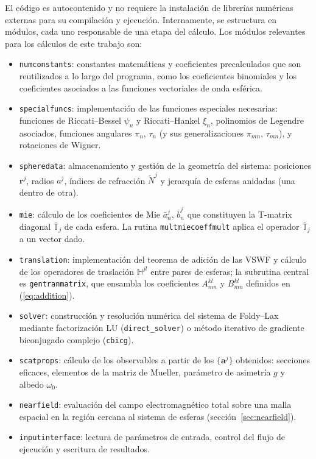 El código es autocontenido y no requiere la instalación de librerías
numéricas externas para su compilación y ejecución. Internamente,
se estructura en módulos, cada uno responsable de una etapa del cálculo.
Los módulos relevantes para los cálculos de este trabajo son:

\begin{itemize}
  \item \texttt{numconstants}: constantes matemáticas y coeficientes
        precalculados que son reutilizados a lo largo del programa,
        como los coeficientes binomiales y los coeficientes asociados a
        las funciones vectoriales de onda esférica.
  \item \texttt{specialfuncs}: implementación de las funciones especiales
        necesarias: funciones de Riccati--Bessel $\psi_n$ y
        Riccati--Hankel $\xi_n$, polinomios de Legendre asociados,
        funciones angulares $\pi_n,\,\tau_n$ (y sus generalizaciones
        $\pi_{mn},\,\tau_{mn}$), y rotaciones de Wigner.
  \item \texttt{spheredata}: almacenamiento y gestión de la geometría
        del sistema: posiciones $\mathbf{r}^j$, radios $a^j$, índices
        de refracción $\tilde{N}^j$ y jerarquía de esferas anidadas (una dentro de otra).
  \item \texttt{mie}: cálculo de los coeficientes de Mie $\bar a_n^j$,
        $\bar b_n^j$ que constituyen la T-matrix diagonal
        $\bar{\mathbb{T}}_j$ de cada esfera. 
        La rutina \texttt{multmiecoeffmult} aplica
        el operador $\bar{\mathbb{T}}_j$ a un vector dado.
  \item \texttt{translation}: implementación del teorema de adición de
        las VSWF y cálculo de los operadores de traslación
        $\mathbb{H}^{jl}$ entre pares de esferas; la subrutina central es
        \texttt{gentranmatrix}, que ensambla los coeficientes
        $A_{mn}^{kl}$ y $B_{mn}^{kl}$ definidos en
        (\ref{eq:addition}).
  \item \texttt{solver}: construcción y resolución numérica del
        sistema de Foldy--Lax mediante factorización LU
        (\texttt{direct\_solver}) o método iterativo de gradiente
        biconjugado complejo (\texttt{cbicg}). 
  \item \texttt{scatprops}: cálculo de los observables a partir de los
        $\{\mathbf{a}^{j}\}$ obtenidos: secciones eficaces, elementos 
        de la matriz de Mueller, parámetro de asimetría $g$ y albedo $\omega_0$.
  \item \texttt{nearfield}: evaluación del campo electromagnético total
        sobre una malla espacial en la región cercana al sistema de
        esferas (sección~\ref{sec:nearfield}).
  \item \texttt{inputinterface}: lectura de parámetros de entrada,
        control del flujo de ejecución y escritura de resultados.
\end{itemize}


